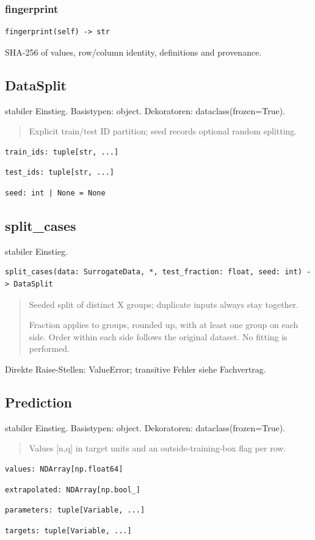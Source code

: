 \subsubsection*{fingerprint}
\begin{lstlisting}
fingerprint(self) -> str
\end{lstlisting}
SHA-256 of values, row/column identity, definitions and provenance.
\subsection{DataSplit}
stabiler Einstieg.
Basistypen: object. Dekoratoren: dataclass(frozen=True).
\begin{quote}
Explicit train/test ID partition; seed records optional random splitting.
\end{quote}
\begin{lstlisting}
train_ids: tuple[str, ...]
\end{lstlisting}
\begin{lstlisting}
test_ids: tuple[str, ...]
\end{lstlisting}
\begin{lstlisting}
seed: int | None = None
\end{lstlisting}
\subsection{split\_cases}
stabiler Einstieg.
\begin{lstlisting}
split_cases(data: SurrogateData, *, test_fraction: float, seed: int) -> DataSplit
\end{lstlisting}
\begin{quote}
Seeded split of distinct X groups; duplicate inputs always stay together.\par Fraction applies to groups, rounded up, with at least one group on each side. Order within each side follows the original dataset. No fitting is performed.
\end{quote}
Direkte Raise-Stellen: ValueError; transitive Fehler siehe Fachvertrag.
\subsection{Prediction}
stabiler Einstieg.
Basistypen: object. Dekoratoren: dataclass(frozen=True).
\begin{quote}
Values [n,q] in target units and an outside-training-box flag per row.
\end{quote}
\begin{lstlisting}
values: NDArray[np.float64]
\end{lstlisting}
\begin{lstlisting}
extrapolated: NDArray[np.bool_]
\end{lstlisting}
\begin{lstlisting}
parameters: tuple[Variable, ...]
\end{lstlisting}
\begin{lstlisting}
targets: tuple[Variable, ...]
\end{lstlisting}
